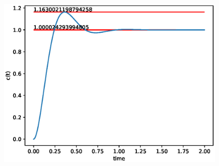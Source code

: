 \begin{enumerate}[label=\thesubsection.\arabic*.,ref=\thesubsection.\theenumi]
\begin{figure}[!h]
    \centering
    \includegraphics[width=\columnwidth]{figs/ee18btech11045/ee18btech11045.eps}
\end{figure}

\end{enumerate}